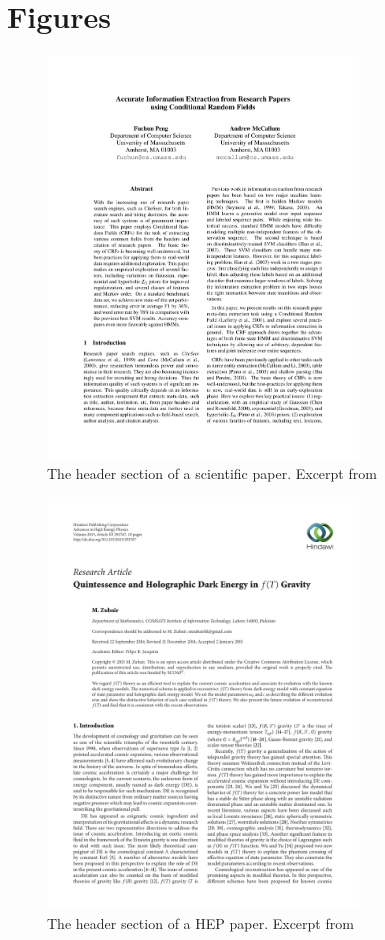
\chapter{Figures} %

\label{AppendixB} %


\begin{figure}[!ht]
\center
\includegraphics[width=3.25in]{Figures/header1.pdf}
\caption{The header section of a scientific paper. Excerpt from \cite{Peng04accurateinformation}}
\label{fig:header1}
\end{figure}

\begin{figure}[!ht]
\center
\includegraphics[width=3.25in]{Figures/header2.pdf}
\caption{The header section of a HEP paper. Excerpt from \cite{zubair2015quintessence}}
\label{fig:header2}
\end{figure}
